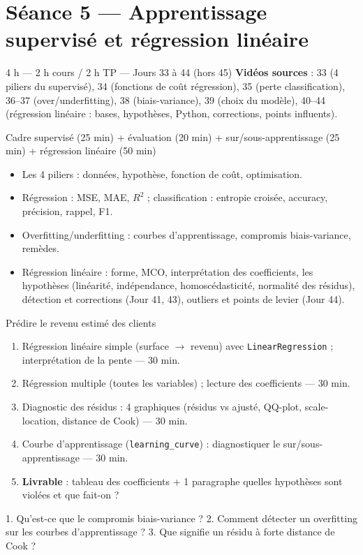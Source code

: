 \documentclass[11pt,a4paper]{article}
\begin{document}
\section*{Séance 5 — Apprentissage supervisé et régression linéaire}
\begin{seancebox}{4 h — 2 h cours / 2 h TP — Jours 33 à 44 (hors 45)}
\textbf{Vidéos sources} : 33 (4 piliers du supervisé), 34 (fonctions de coût régression), 35 (perte classification), 36--37 (over/underfitting), 38 (biais-variance), 39 (choix du modèle), 40--44 (régression linéaire : bases, hypothèses, Python, corrections, points influents).
\end{seancebox}
\begin{coursbox}{Cadre supervisé (25 min) + évaluation (20 min) + sur/sous-apprentissage (25 min) + régression linéaire (50 min)}
\begin{itemize}[nosep]
\item Les 4 piliers : données, hypothèse, fonction de coût, optimisation.
\item Régression : MSE, MAE, $R^2$ ; classification : entropie croisée, accuracy, précision, rappel, F1.
\item Overfitting/underfitting : courbes d'apprentissage, compromis biais-variance, remèdes.
\item Régression linéaire : forme, MCO, interprétation des coefficients, les hypothèses (linéarité, indépendance, homoscédasticité, normalité des résidus), détection et corrections (Jour 41, 43), outliers et points de levier (Jour 44).
\end{itemize}
\end{coursbox}
\begin{tpbox}{Prédire le revenu estimé des clients}
\begin{enumerate}[nosep]
\item Régression linéaire simple (surface $\to$ revenu) avec \texttt{LinearRegression} ; interprétation de la pente — 30 min.
\item Régression multiple (toutes les variables) ; lecture des coefficients — 30 min.
\item Diagnostic des résidus : 4 graphiques (résidus vs ajusté, QQ-plot, scale-location, distance de Cook) — 30 min.
\item Courbe d'apprentissage (\texttt{learning\_curve}) : diagnostiquer le sur/sous-apprentissage — 30 min.
\item \textbf{Livrable} : tableau des coefficients + 1 paragraphe \og quelles hypothèses sont violées et que fait-on ? \fg{}
\end{enumerate}
\end{tpbox}
\begin{evalbox}
1. Qu'est-ce que le compromis biais-variance ? 2. Comment détecter un overfitting sur les courbes d'apprentissage ? 3. Que signifie un résidu à forte distance de Cook ?
\end{evalbox}
\end{document}
